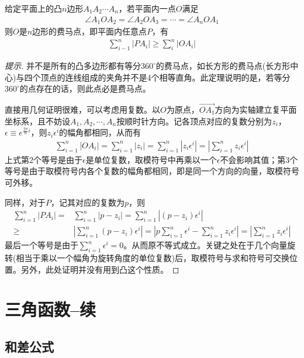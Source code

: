 \begin{theorem}[费马点推广]
  给定平面上的凸$n$边形$A_1A_2\cdots A_n$，若平面内一点$O$满足
  \begin{align*}
    \angle A_1OA_2=\angle A_2OA_3=\cdots=\angle A_nOA_1
  \end{align*}
  则$O$是$n$边形的费马点，即平面内任意点$P$，有
  \begin{align*}
    \sum_{i-1}^n |PA_i|\ge \sum_{i}^n |OA_i|
  \end{align*}
\end{theorem}
\begin{proof}[提示]
  并不是所有的凸多边形都有等分$360^\circ$的费马点，如长方形的费马点(长方形中心)与四个顶点的连线组成的夹角并不是4个相等直角。此定理说明的是，若等分$360^\circ$的点存在的话，则此点必是费马点。

  直接用几何证明很难，可以考虑用复数。以$O$为原点，$\vec{OA_1}$方向为实轴建立复平面坐标系，且不妨设$A_1,A_2,\cdots,A_n$按顺时针方向。记各顶点对应的复数分别为$z_i$，$\epsilon\equiv e^{\frac{2\pi}n i}$，则$z_i\epsilon^i$的幅角都相同，从而有
  \begin{align*}
    \sum_{i=1}^n |OA_i| = \sum_{i=1}^n |z_i|
    = \sum_{i=1}^n |z_i \epsilon^{i}| = \left| \sum_{i=1}^n z_i \epsilon^{i} \right|
  \end{align*}
  上式第2个等号是由于$\epsilon$是单位复数，取模符号中再乘以一个$\epsilon$不会影响其值；第3个等号是由于取模符号内各个复数的幅角都相同，即是同一个方向的向量，取模符号可外移。

  同样，对于$P$，记其对应的复数为$p$，则
  \begin{align*}
    \sum_{i=1}^n |PA_i|={}&\sum_{i=1}^n |p-z_i|=\sum_{i=1}^n |(p-z_i)\epsilon^{i}|\\
    \ge{}& \left| \sum_{i=1}^n (p-z_i)\epsilon^i \right| = \left| p \sum_{i=1}^n \epsilon^i - \sum_{i=1}^n z_i \epsilon^i \right| = \left| \sum_{i=1}^n z_i \epsilon^i \right|
  \end{align*}
  最后一个等号是由于$\sum_{i=1}^n \epsilon^i=0$。从而原不等式成立。关键之处在于几个向量旋转(相当于乘以一个幅角为旋转角度的单位复数)后，取模符号与求和符号可交换位置。另外，此处证明并没有用到凸这个性质。
\end{proof}


\section{三角函数--续}
\label{sec:trigonometric-functions-cont.}

\subsection{和差公式}
\label{sec:sum-and-difference-formula}

